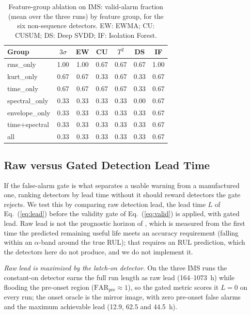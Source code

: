 \documentclass[IJPHM, 2026, 0]{PHMSociety}
\begin{document}
\begin{table}[t] \small
	\begin{center}
	\caption{Feature-group ablation on IMS: valid-alarm fraction (mean over the three runs) by feature group, for the six non-sequence detectors. EW: EWMA; CU: CUSUM; DS: Deep SVDD; IF: Isolation Forest.}
	\label{tab:ablation_general}
	\begin{tabular}{l c c c c c c}
		\hline \hline
		\textbf{Group} & \textbf{$3\sigma$} & \textbf{EW} & \textbf{CU} & \textbf{$T^2$} & \textbf{DS} & \textbf{IF} \\
		\hline
		rms\_only & 1.00 & 1.00 & 0.67 & 0.67 & 0.67 & 1.00 \\
		kurt\_only & 0.67 & 0.67 & 0.33 & 0.67 & 0.33 & 0.67 \\
		time\_only & 0.67 & 0.67 & 0.67 & 0.67 & 0.33 & 0.67 \\
		spectral\_only & 0.33 & 0.33 & 0.33 & 0.33 & 0.00 & 0.67 \\
		envelope\_only & 0.33 & 0.33 & 0.33 & 0.33 & 0.33 & 0.67 \\
		time+spectral & 0.33 & 0.33 & 0.33 & 0.33 & 0.33 & 0.67 \\
		all & 0.33 & 0.33 & 0.33 & 0.33 & 0.33 & 0.67 \\
		\hline \hline
	\end{tabular}
	\end{center}
\end{table}

\subsection{Raw versus Gated Detection Lead Time}
\label{sec:saxena}
If the false-alarm gate is what separates a usable warning from a manufactured one, ranking detectors by lead time without it should reward detectors the gate rejects. We test this by comparing raw detection lead, the lead time $L$ of Eq.~(\ref{eq:lead}) before the validity gate of Eq.~(\ref{eq:valid}) is applied, with gated lead. Raw lead is not the prognostic horizon of , which is measured from the first time the predicted remaining useful life meets an accuracy requirement (falling within an $\alpha$-band around the true RUL); that requires an RUL prediction, which the detectors here do not produce, and we do not implement it.

\emph{Raw lead is maximized by the latch-on detector.} On the three IMS runs the constant-on detector earns the full run length as raw lead (164--1073~h) while flooding the pre-onset region ($\text{FAR}_{\text{pre}} \approx 1$), so the gated metric scores it $L=0$ on every run; the onset oracle is the mirror image, with zero pre-onset false alarms and the maximum achievable lead (12.9, 62.5 and 44.5~h).
\end{document}

